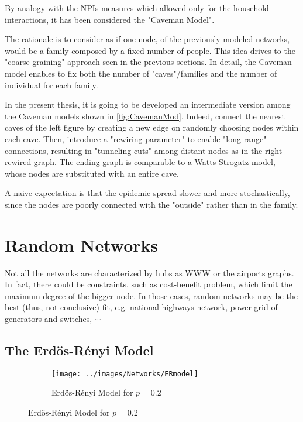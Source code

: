 \documentclass[a4paper,12pt,twoside]{book} %
\theoremstyle{definition}
\begin{document}
By analogy with the NPIs measures which allowed only for the household interactions, it has been considered the "Caveman Model".

The rationale is to consider as if one node, of the previously modeled networks, would be a family composed by a fixed number of people. This idea drives to the "coarse-graining" approach seen in the previous sections.
In detail, the Caveman model enables to fix both the number of "caves"/families and the number of individual for each family. 

In the present thesis, it is going to be developed an intermediate version among the Caveman models shown in \autoref{fig:CavemanMod}. Indeed, connect the nearest caves of the left figure by creating a new edge on randomly choosing nodes within each cave. Then, introduce a "rewiring parameter" to enable "long-range" connections, resulting in "tunneling cuts" among distant nodes as in the right rewired graph. The ending graph is comparable to a Watts-Strogatz model, whose nodes are substituted with an entire cave.

A naive expectation is that the epidemic spread slower and more stochastically, since the nodes are poorly connected with the "outside" rather than in the family.

\section{Random Networks}
Not all the networks are characterized by hubs as WWW or the airports graphs.
In fact, there could be constraints, such as cost-benefit problem, which limit the maximum degree of the bigger node. In those cases, random networks may be the best (thus, not conclusive) fit, e.g. national highways network, power grid of generators and switches, $\cdots$

\subsection{The Erdös-Rényi Model}

\begin{figure}[ht]
    \begin{subfigure}{\textwidth}
        \texttt{[image: ../images/Networks/ERmodel]}
        \centering
        \caption{Erdös-Rényi Model for $p = 0.2$ \cite{Baronchelli:2017_EpidSpreadCompNets}}
        \label{fig:ERmodel}
    \end{subfigure}
\end{figure}
\end{document}
